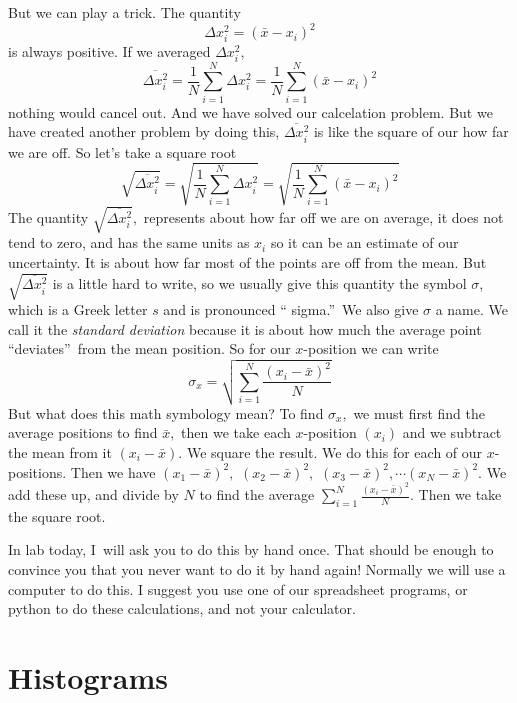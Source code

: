 \documentclass{book}%
\begin{document}
But we can play a trick. The quantity 
\[
\Delta x_{i}^{2}=\left( \bar{x}-x_{i}\right) ^{2} 
\]%
is always positive. If we averaged $\Delta x_{i}^{2},$ 
\[
\overline{\Delta x_{i}^{2}}=\frac{1}{N}\sum_{i=1}^{N}\Delta x_{i}^{2}=\frac{1%
}{N}\sum_{i=1}^{N}\left( \bar{x}-x_{i}\right) ^{2} 
\]%
nothing would cancel out. And we have solved our calcelation problem. But we
have created another problem by doing this, $\overline{\Delta x_{i}^{2}}$ is
like the square of our how far we are off. So let's take a square root%
\[
\sqrt{\overline{\Delta x_{i}^{2}}}=\sqrt{\frac{1}{N}\sum_{i=1}^{N}\Delta
x_{i}^{2}}=\sqrt{\frac{1}{N}\sum_{i=1}^{N}\left( \bar{x}-x_{i}\right) ^{2}} 
\]%
The quantity $\sqrt{\overline{\Delta x_{i}^{2}}},$ represents about how far
off we are on average, it does not tend to zero, and has the same units as $%
x_{i}$ so it can be an estimate of our uncertainty. It is about how far most
of the points are off from the mean. But $\sqrt{\overline{\Delta x_{i}^{2}}}$
is a little hard to write, so we usually give this quantity the symbol $%
\sigma $, which is a Greek letter $s$ and is pronounced \textquotedblleft
sigma.\textquotedblright\ We also give $\sigma $ a name. We call it the 
\emph{standard deviation} because it is about how much the average point
\textquotedblleft deviates\textquotedblright\ from the mean position. So for
our $x$-position we can write 
\[
\sigma _{x}=\sqrt{\sum_{i=1}^{N}\frac{\left( x_{i}-\bar{x}\right) ^{2}}{N}} 
\]%
But what does this math symbology mean? To find $\sigma _{x},$ we must first
find the average positions to find $\bar{x},$ then we take each $x$-position 
$\left( x_{i}\right) $ and we subtract the mean from it $\left( x_{i}-\bar{x}%
\right) .$ We square the result. We do this for each of our $x$-positions.
Then we have $\left( x_{1}-\bar{x}\right) ^{2},$ $\left( x_{2}-\bar{x}%
\right) ^{2},$ $\left( x_{3}-\bar{x}\right) ^{2},\cdots \left( x_{N}-\bar{x}%
\right) ^{2}.$ We add these up, and divide by $N$ to find the average $%
\sum_{i=1}^{N}\frac{\left( x_{i}-\bar{x}\right) ^{2}}{N}.$ Then we take the
square root.

In lab today, I\ will ask you to do this by hand once. That should be enough
to convince you that you never want to do it by hand again! Normally we will
use a computer to do this. I suggest you use one of our spreadsheet
programs, or python to do these calculations, and not your calculator.

\section{Histograms}
\end{document}
